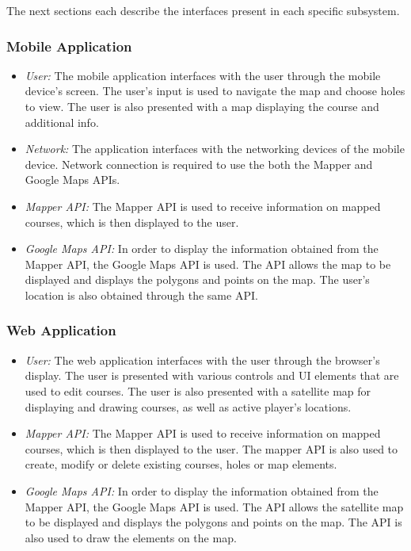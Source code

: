 \documentclass{article}
\begin{document}
    The next sections each describe the interfaces present in each specific
    subsystem.

    \subsubsection{Mobile Application}

    \begin{itemize}
        \item \textit{User:} The mobile application interfaces with the user
            through the mobile device's screen. The user's input is used to
            navigate the map and choose holes to view. The user is also
            presented with a map displaying the course and additional info.
        \item \textit{Network:} The application interfaces with the networking
            devices of the mobile device. Network connection is required to use
            the both the Mapper and Google Maps APIs.
        \item \textit{Mapper API:} The Mapper API is used to receive
            information on mapped courses, which is then displayed to the user.
        \item \textit{Google Maps API:} In order to display the information
            obtained from the Mapper API, the Google Maps API is used. The API
            allows the map to be displayed and displays the polygons and points
            on the map. The user's location is also obtained through the same
            API.
    \end{itemize}

    \subsubsection{Web Application}

    \begin{itemize}
        \item \textit{User:} The web application interfaces with the user
            through the browser's display. The user is presented with various
            controls and UI elements that are used to edit courses. The user is
            also presented with a satellite map for displaying and drawing
            courses, as well as active player's locations.
        \item \textit{Mapper API:} The Mapper API is used to receive
            information on mapped courses, which is then displayed to the user.
            The mapper API is also used to create, modify or delete existing
            courses, holes or map elements.
        \item \textit{Google Maps API:} In order to display the information
            obtained from the Mapper API, the Google Maps API is used. The API
            allows the satellite map to be displayed and displays the polygons
            and points on the map. The API is also used to draw the elements on
            the map. 
    \end{itemize}
\end{document}
